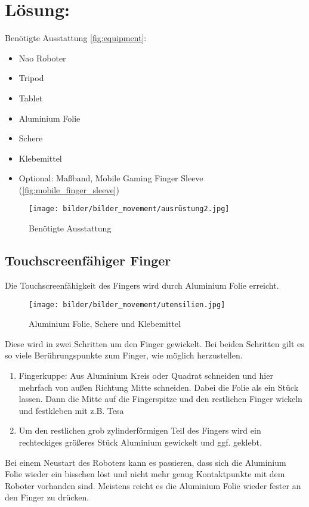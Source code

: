 \section{Lösung:}
Benötigte Ausstattung \vref{fig:equipment}:
\begin{itemize}
    \item Nao Roboter
    \item Tripod
    \item Tablet
    \item Aluminium Folie
    \item Schere
    \item Klebemittel
    \item Optional: Maßband, Mobile Gaming Finger Sleeve (\vref{fig:mobile_finger_sleeve})
\end{itemize}

\begin{figure}[!htbp]
\centering
    \texttt{[image: bilder/bilder\_movement/ausrüstung2.jpg]}
        \caption{Benötigte Ausstattung}
        \label{fig:equipment}
\end{figure}

\subsection{Touchscreenfähiger Finger}
Die Touchscreenfähigkeit des Fingers wird durch Aluminium Folie erreicht. 
\begin{figure}[!htbp]
\centering
    \texttt{[image: bilder/bilder\_movement/utensilien.jpg]}
        \caption{Aluminium Folie, Schere und Klebemittel}
        \label{fig:tools}
\end{figure}
Diese wird in zwei Schritten um den Finger gewickelt. 
Bei beiden Schritten gilt es so viele Berührungspunkte zum Finger, wie möglich herzustellen.
\begin{enumerate}
    \item Fingerkuppe: Aus Aluminium Kreis oder Quadrat schneiden und hier mehrfach von außen Richtung Mitte schneiden. Dabei die Folie als ein Stück lassen. Dann die Mitte auf die Fingerspitze und  den restlichen Finger wickeln und festkleben mit z.B. Tesa
    \item Um den restlichen grob zylinderförmigen Teil des Fingers wird ein rechteckiges größeres Stück Aluminium gewickelt und ggf. geklebt.
\end{enumerate}

Bei einem Neustart des Roboters kann es passieren, dass sich die Aluminium Folie wieder ein bisschen löst und nicht mehr genug Kontaktpunkte mit dem Roboter vorhanden sind. Meistens reicht es die Aluminium Folie wieder fester an den Finger zu drücken. 

